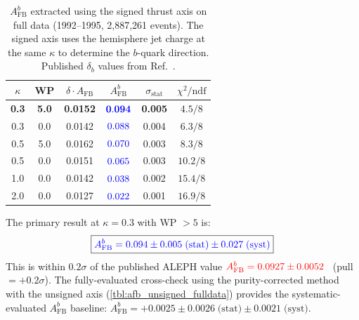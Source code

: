 \documentclass[11pt,a4paper]{article}
\newcommand{\measured}[1]{\textcolor{blue}{#1}}
\newcommand{\external}[1]{\textcolor{red}{#1}}
\begin{document}
\begin{table}[htbp]
\centering
\caption{$A_\text{FB}^b$ extracted using the signed thrust axis
on full data (1992--1995, 2,887,261 events).
The signed axis uses the hemisphere jet charge at the same
$\kappa$ to determine the $b$-quark direction.
Published $\delta_b$ values from Ref.~\cite{LEP:EWWG:2005}.}
\label{tbl:afb_signed_fulldata}
\begin{tabular}{cccccc}
\toprule
$\kappa$ & WP & $\delta \cdot A_\text{FB}$ &
$A_\text{FB}^b$ & $\sigma_\text{stat}$ & $\chi^2/\text{ndf}$ \\
\midrule
\textbf{0.3} & \textbf{5.0} & \textbf{0.0152} &
  $\measured{\mathbf{0.094}}$ & \textbf{0.005} & $4.5/8$ \\
0.3 & 0.0 & 0.0142 & $\measured{0.088}$ & 0.004 & $6.3/8$ \\
0.5 & 5.0 & 0.0162 & $\measured{0.070}$ & 0.003 & $8.3/8$ \\
0.5 & 0.0 & 0.0151 & $\measured{0.065}$ & 0.003 & $10.2/8$ \\
1.0 & 0.0 & 0.0142 & $\measured{0.038}$ & 0.002 & $15.4/8$ \\
2.0 & 0.0 & 0.0127 & $\measured{0.022}$ & 0.001 & $16.9/8$ \\
\bottomrule
\end{tabular}
\end{table}

The primary result at $\kappa = 0.3$ with WP $> 5$ is:
\begin{equation}
\boxed{
\measured{A_\text{FB}^b = 0.094 \pm 0.005\;\text{(stat)} \pm 0.027\;\text{(syst)}}
}
\label{eq:afb_signed_fulldata}
\end{equation}
This is within $0.2\sigma$ of the published ALEPH value
$\external{A_\text{FB}^b = 0.0927 \pm 0.0052}$~\cite{ALEPH:AFBb}
(pull $= +0.2\sigma$).
The fully-evaluated cross-check using the purity-corrected method
with the unsigned axis (\cref{tbl:afb_unsigned_fulldata}) provides
the systematic-evaluated $A_\text{FB}^b$ baseline:
$A_\text{FB}^b = +0.0025 \pm 0.0026\;\text{(stat)} \pm 0.0021\;\text{(syst)}$.
\end{document}
